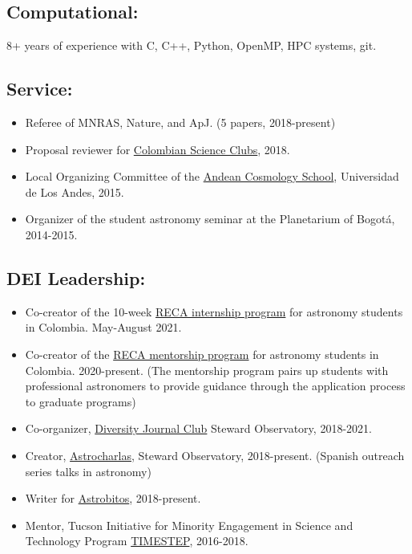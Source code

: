 \documentclass[UTF8]{article}
\begin{document}
\subsection*{Computational:}

8+ years of experience with C, C++, Python, OpenMP, HPC systems, git.\\
\subsection*{Service:} 

\begin{itemize}
  \setlength\itemsep{0.0em}
  \renewcommand\labelitemi{$\cdot$}
\item Referee of MNRAS, Nature, and ApJ. (5 papers, 2018-present)
\item Proposal reviewer for \href{https://clubesdeciencia.co/}{Colombian Science Clubs}, 2018.
\item Local Organizing Committee of the \href{http://forero.github.io/AndeanCosmologySchool/}{Andean Cosmology School}, Universidad de Los Andes, 2015.
\item Organizer of the student astronomy seminar at the Planetarium of Bogot\'a, 2014-2015.
\end{itemize}


\subsection*{DEI Leadership:}
\begin{itemize}
  \setlength\itemsep{0.0em}
  \renewcommand\labelitemi{$\cdot$}
\item Co-creator of the 10-week
  \href{https://recastronomia.github.io/internship/}{RECA internship program}
  for astronomy students in Colombia. May-August 2021.
\item Co-creator of the \href{https://recastronomia.github.io/mentores/}{RECA mentorship program} for astronomy students in Colombia. 2020-present.
  (The mentorship program pairs up students with professional astronomers to
  provide guidance through the application process to graduate programs)
\item Co-organizer,
  \href{https://www.as.arizona.edu/diversity_coffee/}{Diversity Journal Club} Steward Observatory, 2018-2021.
\item Creator, \href{https://astrocharlas.github.io/}{Astrocharlas},
Steward Observatory, 2018-present.
 (Spanish outreach series talks in astronomy)
\item Writer for \href{https://astrobitos.org/}{Astrobitos}, 2018-present.
\item Mentor, Tucson Initiative for Minority Engagement in Science and Technology Program \href{https://lavinia.as.arizona.edu/~timestep/}{TIMESTEP}, 2016-2018.
\end{itemize}
\end{document}
